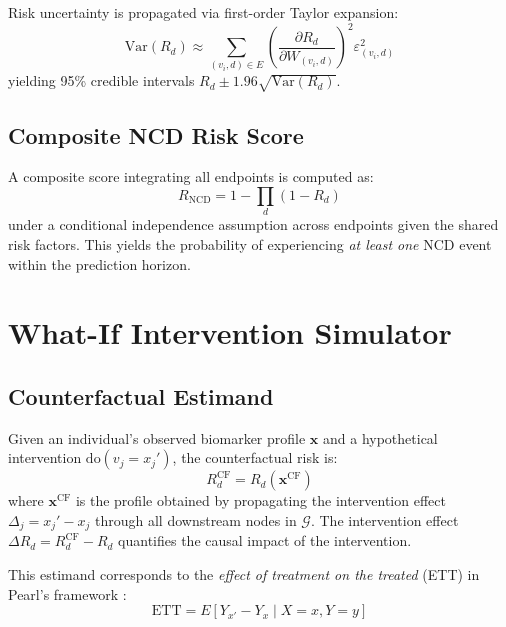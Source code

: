 \documentclass[runningheads]{llncs}
\begin{document}
Risk uncertainty is propagated via first-order Taylor expansion:
\begin{equation}\label{eq:riskvar}
\mathrm{Var}(R_d) \approx \sum_{(v_i,d) \in E}
\left(\frac{\partial R_d}{\partial W_{(v_i,d)}}\right)^2 \varepsilon_{(v_i,d)}^2
\end{equation}
yielding 95\% credible intervals $R_d \pm 1.96\sqrt{\mathrm{Var}(R_d)}$.

\subsection{Composite NCD Risk Score}\label{sec:composite}

A composite score integrating all endpoints is computed as:
\begin{equation}\label{eq:composite}
R_{\mathrm{NCD}} = 1 - \prod_{d} (1 - R_d)
\end{equation}
under a conditional independence assumption across endpoints given the
shared risk factors.  This yields the probability of experiencing
\emph{at least one} NCD event within the prediction horizon.

\section{What-If Intervention Simulator}\label{sec:whatif}

\subsection{Counterfactual Estimand}\label{sec:cf}

Given an individual's observed biomarker profile $\mathbf{x}$ and a
hypothetical intervention $\mathrm{do}(v_j = x_j')$, the
counterfactual risk is:
\begin{equation}\label{eq:cf}
R_d^{\mathrm{CF}} = R_d\!\left(\mathbf{x}^{\mathrm{CF}}\right)
\end{equation}
where $\mathbf{x}^{\mathrm{CF}}$ is the profile obtained by
propagating the intervention effect $\Delta_j = x_j' - x_j$ through
all downstream nodes in $\mathcal{G}$.  The intervention effect
$\Delta R_d = R_d^{\mathrm{CF}} - R_d$ quantifies the causal impact
of the intervention.

This estimand corresponds to the \emph{effect of treatment on the
treated} (ETT) in Pearl's framework \cite{pearl2009causality}:
\begin{equation}\label{eq:ett}
\mathrm{ETT} = E[Y_{x'} - Y_x \mid X=x, Y=y]
\end{equation}
\end{document}
